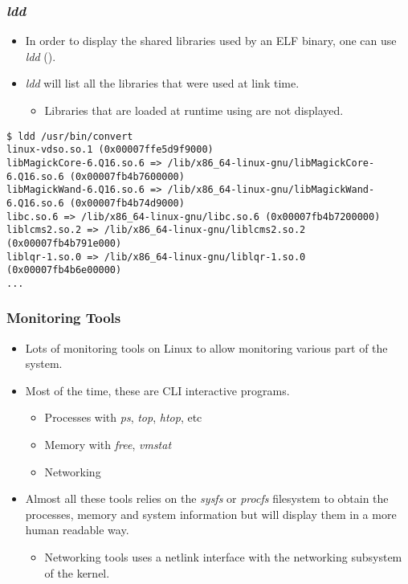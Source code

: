 \begin{frame}[fragile]
  \frametitle{{\em ldd}}
  \begin{itemize}
    \item In order to display the shared libraries used by an ELF binary, one
          can use {\em ldd} ().
    \item {\em ldd} will list all the libraries that were used at link time.
    \begin{itemize}
      \item Libraries that are loaded at runtime using  are not
            displayed.
    \end{itemize}
  \end{itemize}
  \begin{block}{}
    \begin{verbatim}
$ ldd /usr/bin/convert
linux-vdso.so.1 (0x00007ffe5d9f9000)
libMagickCore-6.Q16.so.6 => /lib/x86_64-linux-gnu/libMagickCore-6.Q16.so.6 (0x00007fb4b7600000)
libMagickWand-6.Q16.so.6 => /lib/x86_64-linux-gnu/libMagickWand-6.Q16.so.6 (0x00007fb4b74d9000)
libc.so.6 => /lib/x86_64-linux-gnu/libc.so.6 (0x00007fb4b7200000)
liblcms2.so.2 => /lib/x86_64-linux-gnu/liblcms2.so.2 (0x00007fb4b791e000)
liblqr-1.so.0 => /lib/x86_64-linux-gnu/liblqr-1.so.0 (0x00007fb4b6e00000)
...
    \end{verbatim}
  \end{block}
\end{frame}

\begin{frame}
  \frametitle{Monitoring Tools}
  \begin{itemize}
    \item Lots of monitoring tools on Linux to allow monitoring various part of
          the system.
    \item Most of the time, these are CLI interactive programs.
    \begin{itemize}
        \item Processes with {\em ps}, {\em top}, {\em htop}, etc
        \item Memory with {\em free}, {\em vmstat}
        \item Networking
    \end{itemize}
    \item Almost all these tools relies on the {\em sysfs} or {\em procfs}
          filesystem to obtain the processes, memory and system information but
          will display them in a more human readable way.
    \begin{itemize}
      \item Networking tools uses a netlink interface with the networking
            subsystem of the kernel.
    \end{itemize}
  \end{itemize}
\end{frame}

